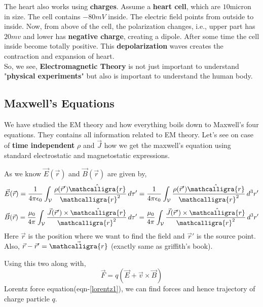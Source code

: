 \documentclass{article}
\newcommand{\scriptr}{\mathord{\mathcalligra{r}}}
\begin{document}
The heart also works using \textbf{charges}. Assume a \textbf{heart cell}, which are $10$micron in size. The cell contains $-80mV$ inside. The electric field points from outside to inside. Now, from above of the cell, the polarization changes, i.e., upper part has $20mv$ and lower has \textbf{negative charge}, creating a dipole. After some time the cell inside become totally positive. This \textbf{depolarization} waves creates the contraction and expansion of heart.\\
So, we see, \textbf{Electromagnetic Theory} is not just important to understand "\textbf{physical experiments}" but also is important to understand the human body.

\subsection{Maxwell's Equations}
We have studied the EM theory and how everything boils down to Maxwell's four equations. They contains all information related to EM theory. Let's see on case of \textbf{time independent} $\rho$ and $\vec{J}$ how we get the maxwell's equation using standard electrostatic and magnetostatic expressions.

As we know $\vec{E}(\vec{r})$ and $\vec{B}(\vec{r})$ are given by,
\begin{equation}
\vec{E}(\vec{r}) = \frac{1}{4\pi \epsilon_0} 
\int_{\mathcal{V}} \frac{\rho(\vec{r}')\hat{\scriptr}}{\scriptr^2} \, d\tau' = \frac{1}{4\pi \epsilon_0} 
\int_{\mathcal{V}} \frac{\rho(\vec{r}')\hat{\scriptr}}{\scriptr^2} \, d^3r'
\label{estat1}
\end{equation}
\begin{equation}
\vec{B}(\vec{r}) = \frac{\mu_0}{4\pi} 
\int_{\mathcal{V}} \frac{\vec{J}(\vec{r}')\times \hat{\scriptr}}{\scriptr^2} \, d\tau' = \frac{\mu_0}{4\pi} 
\int_{\mathcal{V}} \frac{\vec{J}(\vec{r}')\times \hat{\scriptr}}{\scriptr^2} \, d^3r'
\label{mstat1}
\end{equation}
Here $\vec{r}$ is the position where we want to find the field and $\vec{r}'$ is the source point. Also, $\vec{r}-\vec{r}'=\vec{\scriptr}$ (exactly same as griffith's book).

Using this two along with,
\begin{equation}
    \vec{F}=q(\vec{E}+\vec{v}\times \vec{B})
    \label{lorentz1}
\end{equation}
Lorentz force equation(eqn-\ref{lorentz1}), we can find forces and hence trajectory of charge particle $q$.
\end{document}
